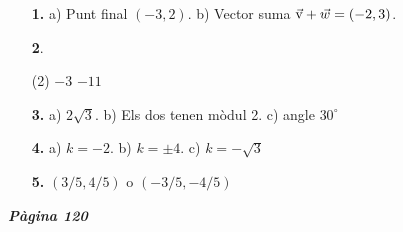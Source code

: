 \documentclass[a4paper, pdf, twoside]{book}
\begin{document}
\begin{multicols}{2}
\begin{enumerate}
\vspace{0.25cm}
\item[\fontfamily{phv}\selectfont\color{blue}\textbf{1. }]  \scalebox{0.6}{\simbolclau } 
a) Punt final $(-3,2)$. b) Vector suma $\vec{\mathrm{v}} +\vec w=(-2,3)$.
\vspace{0.25cm}



 \item[\fontfamily{phv}\selectfont\color{blue}\textbf{2}. ]  \scalebox{0.6}{\simbolclau } 
 \begin{tasks}[column-sep=1em, item-indent=1.3333em](2)
	 \task $-3$
	 \task $-11$
\end{tasks}
\vspace{0.25cm}
\item[\fontfamily{phv}\selectfont\color{blue}\textbf{3. }]  \scalebox{0.6}{\simbolclau } 
 a) $2\sqrt {3}$. b) Els dos tenen mòdul 2. c) angle $30^\circ $
\vspace{0.25cm}
\item[\fontfamily{phv}\selectfont\color{blue}\textbf{4. }]  \scalebox{0.6}{\simbolclau } 
a) $k=-2$. b) $k=\pm 4$. c) $k=-\sqrt {3}$
\vspace{0.25cm}
\item[\fontfamily{phv}\selectfont\color{blue}\textbf{5. }]  \scalebox{0.6}{\simbolclau } 
$(3/5, 4/5)$ o $(-3/5, -4/5)$
 \end{enumerate}
\vfill\null
\columnbreak
\def\currentname{Solucions del Tema 9}
\vspace*{0.75cm}

 

\vspace*{0.4cm}
 {}
\vspace{0.3cm}


{\textbf{\em Pàgina 120}} \hrulefill
\begin{enumerate}
\vspace{0.25cm}




\end{enumerate}
\end{multicols}
\end{document}
